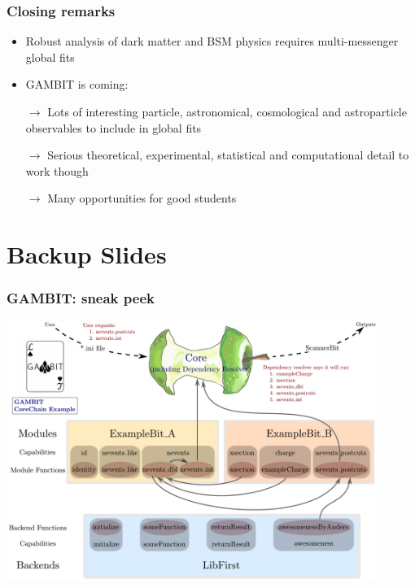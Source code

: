\documentclass[xcolor=dvipsnames]{beamer}
\begin{document}
\begin{frame}
\frametitle{Closing remarks}

\begin{itemize}
\item{Robust analysis of dark matter and BSM physics requires multi-messenger global fits}
\item{GAMBIT is coming:}\bi
\item[$\rightarrow$]{\alert{Lots} of interesting particle, astronomical, cosmological and astroparticle observables to include in global fits}
\item[$\rightarrow$]{Serious theoretical, experimental, statistical and computational detail to work though}
\item[$\rightarrow$]{\alert{Many} opportunities for good students}\ei
\end{itemize}


\end{frame}

\appendix

\section{Backup Slides}

\begin{frame}
\frametitle{GAMBIT: sneak peek}
\centering
\includegraphics[width=0.9\textwidth]{coreChainDiagram_example_wlogo}	
\end{frame}
\end{document}
